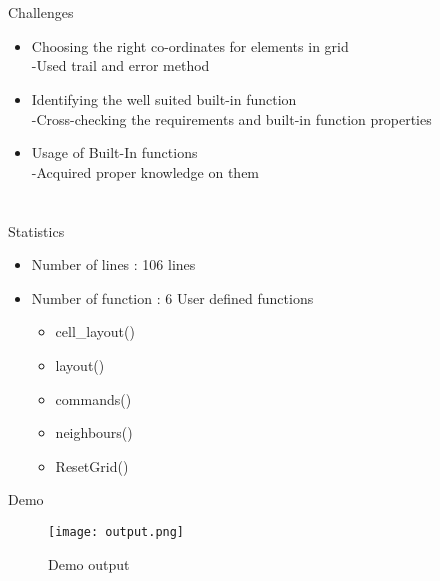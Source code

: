 \documentclass{beamer}
\begin{document}
\section{}
\begin{frame}
{\huge Challenges}
\begin{itemize}
\item Choosing the right co-ordinates for elements in  grid\\ { \;-Used trail and error method}
\item Identifying the well suited built-in function \\ {\;-Cross-checking the requirements and built-in function properties}
\item Usage of Built-In functions \\ {\;-Acquired proper knowledge on them}
\end{itemize}
\end{frame}

\section{}

\begin{frame}{\huge Statistics}
\begin{itemize}
\item Number of lines : 106 lines
\item Number of function : 6 User defined functions
\begin{itemize}
\item cell\_layout()
\item layout()
\item commands()
\item neighbours()
\item ResetGrid()
\end{itemize}
\end {itemize}
\end{frame}
\begin{frame}{\huge Demo}
\begin{figure}[C:\Users\Adithya\Desktop]
    \centering
    \texttt{[image: output.png]}
    \caption{Demo output}
    \label{fig:demo1}
\end{figure}
\end{frame}

\subsection{}
\begin{frame}
\end{frame}
\end{document}
